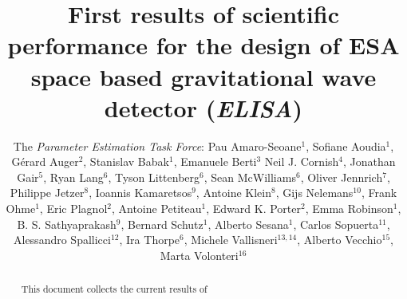 \documentclass{iopart}
\begin{document}
\title
{First results of scientific performance for the design of ESA space based gravitational wave detector ({\it ELISA}) }

\author{The \emph{Parameter Estimation Task Force}:
Pau Amaro-Seoane$^1$,
Sofiane Aoudia$^1$,
G\'erard Auger$^2$,
Stanislav Babak$^1$,
Emanuele Berti$^3$
Neil J. Cornish$^4$,
Jonathan Gair$^5$,
Ryan Lang$^6$,
Tyson Littenberg$^6$,
Sean McWilliams$^6$,
Oliver Jennrich$^7$,
Philippe Jetzer$^8$,
Ioannis Kamaretsos$^9$,
Antoine Klein$^8$,
Gijs Nelemans$^{10}$,
Frank Ohme$^1$,
Eric Plagnol$^2$,
Antoine Petiteau$^1$,
Edward K. Porter$^2$,
Emma Robinson$^1$,
B. S. Sathyaprakash$^9$,
Bernard Schutz$^1$,
Alberto Sesana$^1$,
Carlos Sopuerta$^{11}$,
Alessandro Spallicci$^{12}$,
Ira Thorpe$^6$,
Michele Vallisneri$^{13,14}$,
Alberto Vecchio$^{15}$,
Marta Volonteri$^{16}$
}

\address{$^1$ Max-Planck-Institut f\"ur Gravitationsphysik (Albert-Einstein-Institut), Am M\"uhlenberg 1, D-14476 Golm bei Potsdam, Germany}
\address{$^2$ APC, UMR 7164, Univ.\ Paris 7 Denis Diderot, 10, rue Alice Domon et Leonie Duquet, 75025 Paris Cedex 13, France}
\address{$^3$ University of Mississippi, USA}
\address{$^4$ Dept.\ of Physics, Montana State Univ., Bozeman, MT 59717, USA}
\address{$^5$ Inst.\ of Astronomy, Univ.\ of Cambridge, Madingley Rd., Cambridge, CB30HA, UK}
\address{$^6$ Gravitational Astrophysics Lab., NASA Goddard Space Flight Center, 8800 Greenbelt Rd., Greenbelt, MD 20771, USA}
\address{$^7$ European Space Agency}
\address{$^8$ Institute of Theoretical Physics, University of Zurich}
\address{$^9$ School of Physics and Astronomy, Cardiff Univ., 5, The Parade, Cardiff, CF243YB, UK}
\address{$^{10}$ Department of Astrophysics, Radboud University Nijmegen, The Netherlands}
\address{$^{11}$ Institute of Space Sciences (ICE-CSIC), Barcelona, Spain}
\address{$^{12}$ University of Orleans, France}
\address{$^{13}$ Jet Propulsion Laboratory, California Inst.\ of Technology, Pasadena, CA 91109, USA}
\address{$^{14}$ Theoretical Astrophysics, California Inst.\ of Technology, Pasadena, CA 91125}
\address{$^{15}$ School of Physics and Astronomy, Univ.\ of Birmingham, Edgbaston, Birmingham B152TT, UK}
\address{$^{16}$ University of Michigan}



\begin{abstract}

This document collects the current results of 

\end{abstract}
\end{document}
